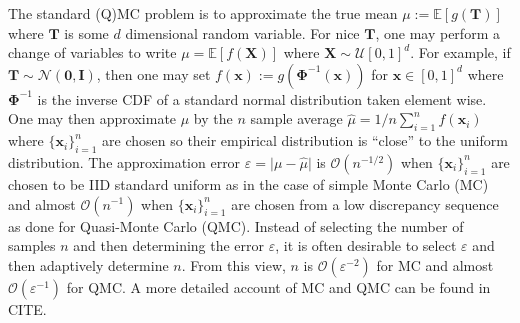 \documentclass[graybox]{svmult}
\newcommand{\AGSComment}[1]{{\color{red} #1}}
\begin{document}
The standard (Q)MC problem is to approximate the true mean $\mu := \mathbb{E}[g(\boldsymbol{T})]$ where $\boldsymbol{T}$ is some $d$ dimensional random variable. For nice $\boldsymbol{T}$, one may perform a change of variables to write $\mu = \mathbb{E}[f(\boldsymbol{X})]$ where $\boldsymbol{X} \sim \mathcal{U}[0,1]^d$. For example, if $\boldsymbol{T} \sim \mathcal{N}(\boldsymbol{0},\boldsymbol{I})$, then one may set $f(\boldsymbol{x}) := g(\boldsymbol{\Phi}^{-1}(\boldsymbol{x}))$ for $\boldsymbol{x} \in [0,1]^d$ where $\boldsymbol{\Phi}^{-1}$ is the inverse CDF of a standard normal distribution taken element wise. One may then approximate $\mu$ by the $n$ sample average $\hat{\mu} = 1/n \sum_{i=1}^n f(\boldsymbol{x}_i)$ where $\{\boldsymbol{x}_i\}_{i=1}^n$ are chosen so their empirical distribution is ``close'' to the uniform distribution. The approximation error $\varepsilon = \lvert \mu - \hat{\mu} \rvert$ is $\mathcal{O}(n^{-1/2})$ when $\{\boldsymbol{x}_i\}_{i=1}^n$ are chosen to be IID standard uniform as in the case of simple Monte Carlo (MC) and almost $\mathcal{O}(n^{-1})$ when $\{\boldsymbol{x}_i\}_{i=1}^n$ are chosen from a low discrepancy sequence as done for Quasi-Monte Carlo (QMC). Instead of selecting the number of samples $n$ and then determining the error $\varepsilon$, it is often desirable to select $\varepsilon$ and then adaptively determine $n$. From this view, $n$ is $\mathcal{O}(\varepsilon^{-2})$ for MC and almost $\mathcal{O}(\varepsilon^{-1})$ for QMC. A more detailed account of MC and QMC can be found in \AGSComment{CITE}.
\end{document}
